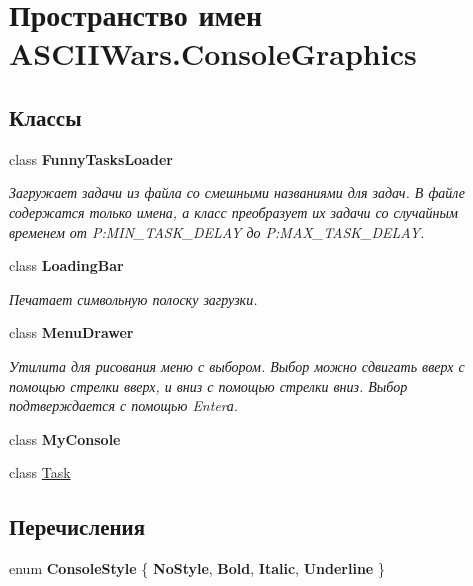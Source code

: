 \hypertarget{namespace_a_s_c_i_i_wars_1_1_console_graphics}{}\section{Пространство имен A\+S\+C\+I\+I\+Wars.\+Console\+Graphics}
\label{namespace_a_s_c_i_i_wars_1_1_console_graphics}
\subsection*{Классы}
\begin{DoxyCompactItemize}
\item 
class {\bfseries Funny\+Tasks\+Loader}
\begin{DoxyCompactList}\small\item\em Загружает задачи из файла со смешными названиями для задач. В файле содержатся только имена, а класс преобразует их задачи со случайным временем от P\+:\+M\+I\+N\+\_\+\+T\+A\+S\+K\+\_\+\+D\+E\+L\+AY до P\+:\+M\+A\+X\+\_\+\+T\+A\+S\+K\+\_\+\+D\+E\+L\+AY. \end{DoxyCompactList}\item 
class {\bfseries Loading\+Bar}
\begin{DoxyCompactList}\small\item\em Печатает символьную полоску загрузки. \end{DoxyCompactList}\item 
class {\bfseries Menu\+Drawer}
\begin{DoxyCompactList}\small\item\em Утилита для рисования меню с выбором. Выбор можно сдвигать вверх с помощью стрелки вверх, и вниз с помощью стрелки вниз. Выбор подтверждается с помощью Enter\textquotesingle{}а. \end{DoxyCompactList}\item 
class {\bfseries My\+Console}
\item 
class \hyperlink{class_a_s_c_i_i_wars_1_1_console_graphics_1_1_task}{Task}
\end{DoxyCompactItemize}
\subsection*{Перечисления}
\begin{DoxyCompactItemize}
\item 
\hypertarget{namespace_a_s_c_i_i_wars_1_1_console_graphics_a9b323f4b2bf48062c9245b24e74b2882}{}\label{namespace_a_s_c_i_i_wars_1_1_console_graphics_a9b323f4b2bf48062c9245b24e74b2882} 
enum {\bfseries Console\+Style} \{ {\bfseries No\+Style}, 
{\bfseries Bold}, 
{\bfseries Italic}, 
{\bfseries Underline}
 \}
\end{DoxyCompactItemize}

